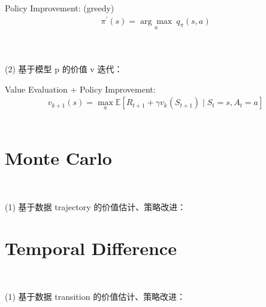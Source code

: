 \documentclass{article}
\begin{document}
Policy Improvement: (greedy)
\begin{align*}
    \pi^{\prime}(s) = \underset{a}{\arg \max} \ q_{\pi}(s, a)
\end{align*}
\\[3pt]


~ \\[3pt]
\begin{CJK}{UTF8}{gbsn}
    (2) 基于模型 p 的价值 v 迭代： \\[3pt]
\end{CJK}


Value Evaluation + Policy Improvement: 
\begin{align*}
    v_{k+1}(s) = \max_{a} 
    \mathbb{E} \left[ R_{t+1}+\gamma 
    v_{k} \left( S_{t+1} \right) \mid S_{t}=s, A_{t}=a \right]
\end{align*}
\\[3pt]

\section{Monte Carlo}


~ \\[3pt]
\begin{CJK}{UTF8}{gbsn}
    (1) 基于数据 trajectory 的价值估计、策略改进： \\[3pt]
\end{CJK}

\section{Temporal Difference}


~ \\[3pt]
\begin{CJK}{UTF8}{gbsn}
    (1) 基于数据 transition 的价值估计、策略改进： \\[3pt]
\end{CJK}
\end{document}
